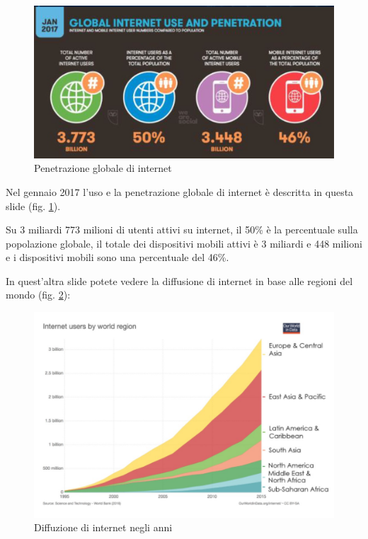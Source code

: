 \begin{figure}[ht]
    \centering
    \includegraphics[width=1\linewidth]{images/03_lez_fig_05.jpg}
    \caption{Penetrazione globale di internet}
    \label{fig:penetrazione_globale_internet}
\end{figure}

Nel gennaio 2017 l'uso e la penetrazione globale di internet è descritta in questa slide (fig. \ref{fig:penetrazione_globale_internet}). 

Su 3 miliardi 773 milioni di utenti attivi su internet, il 50\% è la percentuale sulla popolazione globale, il totale dei dispositivi mobili attivi è 3 miliardi e 448 milioni e i dispositivi mobili sono una percentuale del 46\%. 

In quest'altra slide potete vedere la diffusione di internet in base alle regioni del mondo (fig. \ref{fig:diffusione_internet}):
\begin{figure}[ht]
    \centering
    \includegraphics[width=0.9\linewidth]{images/03_lez_fig_06.jpg}
    \caption{Diffuzione di internet negli anni}
    \label{fig:diffusione_internet}
\end{figure}


